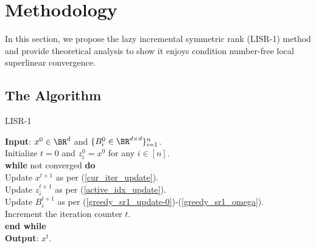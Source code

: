 \section{Methodology}\label{sec:methodology}

In this section, we propose the lazy incremental symmetric rank (LISR-1) method and provide theoretical analysis to show it enjoys condition number-free local superlinear convergence.

\subsection{The Algorithm}

\begin{algorithm}[tb]
\caption{LISR-1}\label{alg:iqn_algos}
\begin{algorithmic}[1]
\STATE \textbf{Input}: $x^0\in\BR^d$ and $\{B_i^0\in\BR^{d\times d}\}_{i=1}^n$.\\[0.1cm]
\STATE Initialize $t=0$ and $z_i^0 = x^0$ for any $i \in [n]$. \\[0.1cm]
\STATE \textbf{while} not converged \textbf{do} \\[0.1cm]
\STATE \quad Update $x^{t+1}$ as per (\ref{cur_iter_update}). \\[0.1cm]
\STATE \quad Update $z_{i}^{t+1}$ as per (\ref{active_idx_update}). \\[0.1cm]
\STATE \quad Update $B_{i}^{t+1}$ as per (\ref{greedy_sr1_update-0})-(\ref{greedy_sr1_omega}). \\[0.1cm]
\STATE \quad Increment the iteration counter $t$. \\[0.1cm]
\STATE \textbf{end while} \\[0.1cm]
\STATE \textbf{Output}:  $x^t$.
\end{algorithmic}
\end{algorithm}

